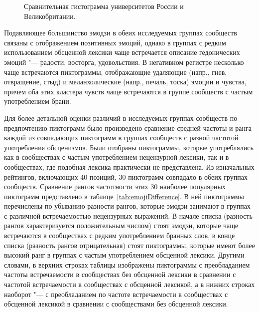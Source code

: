 \begin{figure}[ht]
	\caption{Сравнительная гистограмма университетов России и Великобритании.}\label{fig:emojiFrequency}
\end{figure}

Подавляющее большинство эмодзи в обеих исследуемых группах сообществ связаны с отображением позитивных эмоций, однако в группах с редким использованием обсценной лексики чаще встречается описание гедонических эмоций "--- радости, восторга, удовольствия. В негативном регистре несколько чаще встречаются пиктограммы, отображающие удаляющие (напр., гнев, отвращение, стыд) и меланхолические (напр., печаль, тоска) эмоции и чувства, причем оба этих кластера чувств чаще встречаются в группе сообществ с частым употреблением брани.

Для более детальной оценки различий в исследуемых группах сообществ по предпочтению пиктограмм было произведено сравнение средней частоты и ранга каждой из совпадающих пиктограмм в группах сообществ с разной частотой употребления обсценизмов. Были отобраны пиктограммы, которые употреблялись как в сообществах с частым употреблением нецензурной лексики, так и в сообществах, где подобная лексика практически не представлена. Из изначальных рейтингов, включающих 40 позиций, 30 пиктограмм совпадало в обеих группах сообществ. Сравнение рангов частотности этих 30 наиболее популярных пиктограмм представлено в таблице~\cref{tab:emojiDifference}. В ней пиктограммы перечислены по убыванию разности рангов, которые эмодзи занимают в группах с различной встречаемостью нецензурных выражений. В начале списка (разность рангов характеризуется положительным числом) стоят эмодзи, которые чаще встречаются в сообществах с редким употреблением бранных слов, в конце списка (разность рангов отрицательная) стоят пиктограммы, которые имеют более высокий ранг в группах с частым употреблением обсценной лексики. Другими словами, в верхних строках таблицы изображены пиктограммы с преобладанием частоты встречаемости в сообществах без обсценной лексики в сравнении с частотой встречаемости в сообществах с обсценной лексикой, а в нижних строках наоборот "--- с преобладанием по частоте встречаемости в сообществах с обсценной лексикой в сравнении с сообществами без обсценной лексики.

